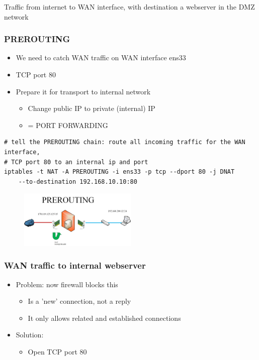 \documentclass{article}
\begin{document}
Traffic from internet to WAN interface, with destination a webserver in the DMZ network

\subsubsection{PREROUTING}

\begin{itemize}
    \item We need to catch WAN traffic on WAN interface ens33
    \item TCP port 80
    \item Prepare it for transport to internal network
    \begin{itemize}
        \item Change public IP to private (internal) IP
        \item = PORT FORWARDING
    \end{itemize}
\end{itemize}

\begin{verbatim}
# tell the PREROUTING chain: route all incoming traffic for the WAN interface, 
# TCP port 80 to an internal ip and port
iptables -t NAT -A PREROUTING -i ens33 -p tcp --dport 80 -j DNAT 
    --to-destination 192.168.10.10:80
\end{verbatim}

\begin{figure}[H]
    \centering
    \includegraphics[width=0.5\textwidth]{prerouting-chain.jpg}
\end{figure}

\subsubsection{WAN traffic to internal webserver}

\begin{itemize}
    \item Problem: now firewall blocks this
    \begin{itemize}
        \item Is a 'new' connection, not a reply
        \item It only allows related and established connections
    \end{itemize}
    \item Solution: 
    \begin{itemize}
        \item Open TCP port 80
    \end{itemize}
\end{itemize}
\end{document}
